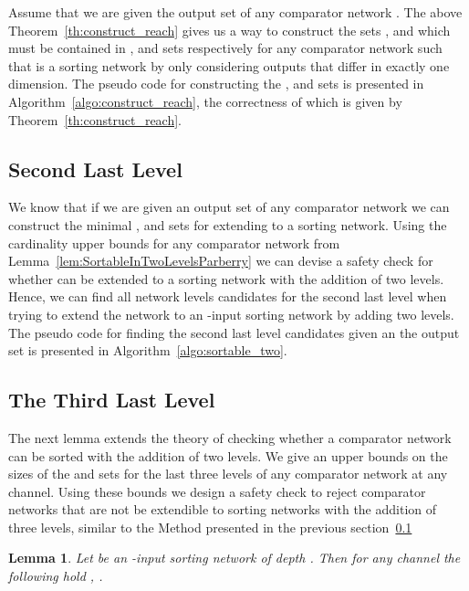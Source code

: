 \documentclass[13pt,a4paper]{article}
\newtheorem{lemma}[theorem]{Lemma}
\begin{document}
Assume that we are given the output set  of any comparator network . The above Theorem~\ref{th:construct_reach} gives us a way to construct the sets ,  and  which must be contained in ,  and  sets respectively for any comparator network  such that  is a sorting network by only considering outputs  that differ in exactly one dimension. The pseudo code for constructing the ,  and  sets is presented in Algorithm~\ref{algo:construct_reach}, the correctness of which is given by Theorem~\ref{th:construct_reach}.



\subsection{Second Last Level}
\label{sec:sortable_two}

We know that if we are given an output set  of any comparator network  we can construct the minimal ,  and  sets for extending  to a sorting network. Using the cardinality upper bounds for any comparator network from Lemma~\ref{lem:SortableInTwoLevelsParberry} we can devise a safety check for whether  can be extended to a sorting network with the addition of two levels. Hence, we can find all network levels candidates for the second last level when trying to extend the network  to an -input sorting network by adding two levels. The pseudo code for finding the second last level candidates given an the output set  is presented in Algorithm~\ref{algo:sortable_two}.



\subsection{The Third Last Level}

The next lemma extends the theory of checking whether a comparator network can be sorted with the addition of two levels. We give an upper bounds on the sizes of the  and  sets for the last three levels of any comparator network  at any channel. Using these bounds we design a safety check to reject comparator networks that are not be extendible to sorting networks with the addition of three levels, similar to the Method presented in the previous section~\ref{sec:sortable_two}

\begin{lemma}
\label{lem:reach_3}
Let  be an -input sorting network of depth . Then for any channel  the following hold , .
\end{lemma}
\end{document}
